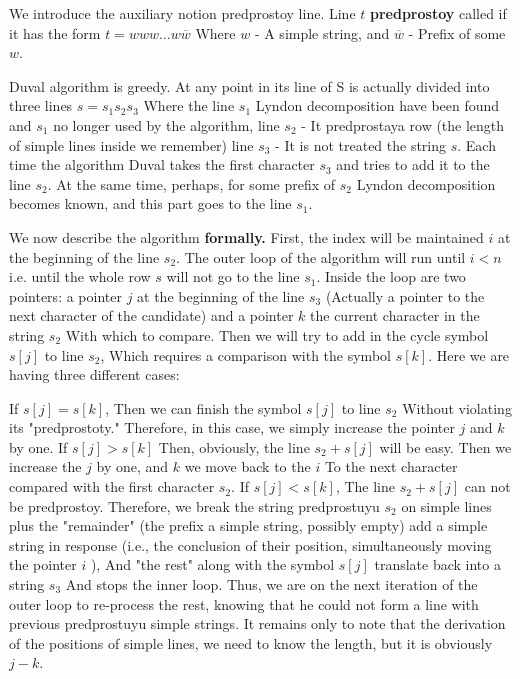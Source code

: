 We introduce the auxiliary notion predprostoy line. Line $t$ \textbf{predprostoy} called if it has the form $t = w w w \ldots w \overline {w}$ Where $w$ - A simple string, and $\overline {w}$ - Prefix of some $w$.

Duval algorithm is greedy. At any point in its line of S is actually divided into three lines $s = s_1 s_2 s_3$ Where the line $s_1$ Lyndon decomposition have been found and $s_1$ no longer used by the algorithm, line $s_2$ - It predprostaya row (the length of simple lines inside we remember) line $s_3$ - It is not treated the string $s$. Each time the algorithm Duval takes the first character $s_3$ and tries to add it to the line $s_2$. At the same time, perhaps, for some prefix of $s_2$ Lyndon decomposition becomes known, and this part goes to the line $s_1$.

We now describe the algorithm \textbf{formally.} First, the index will be maintained $i$ at the beginning of the line $s_2$. The outer loop of the algorithm will run until $i <n$ i.e. until the whole row $s$ will not go to the line $s_1$. Inside the loop are two pointers: a pointer $j$ at the beginning of the line $s_3$ (Actually a pointer to the next character of the candidate) and a pointer $k$ the current character in the string $s_2$ With which to compare. Then we will try to add in the cycle symbol $s [j]$ to line $s_2$, Which requires a comparison with the symbol $s [k]$. Here we are having three different cases:

If $s [j] = s [k]$, Then we can finish the symbol $s [j]$ to line $s_2$ Without violating its "predprostoty." Therefore, in this case, we simply increase the pointer $j$ and $k$ by one.
If $s [j]> s [k]$ Then, obviously, the line $s_2 + s [j]$ will be easy. Then we increase the $j$ by one, and $k$ we move back to the $i$ To the next character compared with the first character $s_2$.
If $s [j] <s [k]$, The line $s_2 + s [j]$ can not be predprostoy. Therefore, we break the string predprostuyu $s_2$ on simple lines plus the "remainder" (the prefix a simple string, possibly empty) add a simple string in response (i.e., the conclusion of their position, simultaneously moving the pointer $i$ ), And "the rest" along with the symbol $s [j]$ translate back into a string $s_3$ And stops the inner loop. Thus, we are on the next iteration of the outer loop to re-process the rest, knowing that he could not form a line with previous predprostuyu simple strings. It remains only to note that the derivation of the positions of simple lines, we need to know the length, but it is obviously $j-k$.
